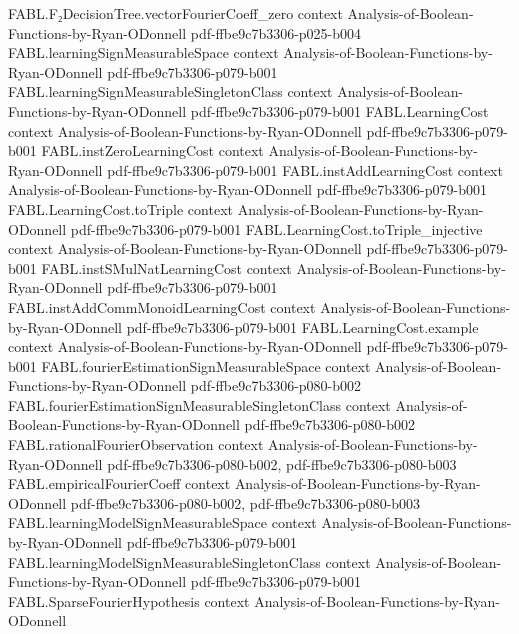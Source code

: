\begin{theorem}
\proofstep
  {FABL.F₂DecisionTree.vectorFourierCoeff_zero}
  {context}
  {Analysis-of-Boolean-Functions-by-Ryan-ODonnell}
  {pdf-ffbe9c7b3306-p025-b004}
\proofstep
  {FABL.learningSignMeasurableSpace}
  {context}
  {Analysis-of-Boolean-Functions-by-Ryan-ODonnell}
  {pdf-ffbe9c7b3306-p079-b001}
\proofstep
  {FABL.learningSignMeasurableSingletonClass}
  {context}
  {Analysis-of-Boolean-Functions-by-Ryan-ODonnell}
  {pdf-ffbe9c7b3306-p079-b001}
\proofstep
  {FABL.LearningCost}
  {context}
  {Analysis-of-Boolean-Functions-by-Ryan-ODonnell}
  {pdf-ffbe9c7b3306-p079-b001}
\proofstep
  {FABL.instZeroLearningCost}
  {context}
  {Analysis-of-Boolean-Functions-by-Ryan-ODonnell}
  {pdf-ffbe9c7b3306-p079-b001}
\proofstep
  {FABL.instAddLearningCost}
  {context}
  {Analysis-of-Boolean-Functions-by-Ryan-ODonnell}
  {pdf-ffbe9c7b3306-p079-b001}
\proofstep
  {FABL.LearningCost.toTriple}
  {context}
  {Analysis-of-Boolean-Functions-by-Ryan-ODonnell}
  {pdf-ffbe9c7b3306-p079-b001}
\proofstep
  {FABL.LearningCost.toTriple_injective}
  {context}
  {Analysis-of-Boolean-Functions-by-Ryan-ODonnell}
  {pdf-ffbe9c7b3306-p079-b001}
\proofstep
  {FABL.instSMulNatLearningCost}
  {context}
  {Analysis-of-Boolean-Functions-by-Ryan-ODonnell}
  {pdf-ffbe9c7b3306-p079-b001}
\proofstep
  {FABL.instAddCommMonoidLearningCost}
  {context}
  {Analysis-of-Boolean-Functions-by-Ryan-ODonnell}
  {pdf-ffbe9c7b3306-p079-b001}
\proofstep
  {FABL.LearningCost.example}
  {context}
  {Analysis-of-Boolean-Functions-by-Ryan-ODonnell}
  {pdf-ffbe9c7b3306-p079-b001}
\proofstep
  {FABL.fourierEstimationSignMeasurableSpace}
  {context}
  {Analysis-of-Boolean-Functions-by-Ryan-ODonnell}
  {pdf-ffbe9c7b3306-p080-b002}
\proofstep
  {FABL.fourierEstimationSignMeasurableSingletonClass}
  {context}
  {Analysis-of-Boolean-Functions-by-Ryan-ODonnell}
  {pdf-ffbe9c7b3306-p080-b002}
\proofstep
  {FABL.rationalFourierObservation}
  {context}
  {Analysis-of-Boolean-Functions-by-Ryan-ODonnell}
  {pdf-ffbe9c7b3306-p080-b002,
    pdf-ffbe9c7b3306-p080-b003}
\proofstep
  {FABL.empiricalFourierCoeff}
  {context}
  {Analysis-of-Boolean-Functions-by-Ryan-ODonnell}
  {pdf-ffbe9c7b3306-p080-b002,
    pdf-ffbe9c7b3306-p080-b003}
\proofstep
  {FABL.learningModelSignMeasurableSpace}
  {context}
  {Analysis-of-Boolean-Functions-by-Ryan-ODonnell}
  {pdf-ffbe9c7b3306-p079-b001}
\proofstep
  {FABL.learningModelSignMeasurableSingletonClass}
  {context}
  {Analysis-of-Boolean-Functions-by-Ryan-ODonnell}
  {pdf-ffbe9c7b3306-p079-b001}
\proofstep
  {FABL.SparseFourierHypothesis}
  {context}
  {Analysis-of-Boolean-Functions-by-Ryan-ODonnell}

\end{theorem}
